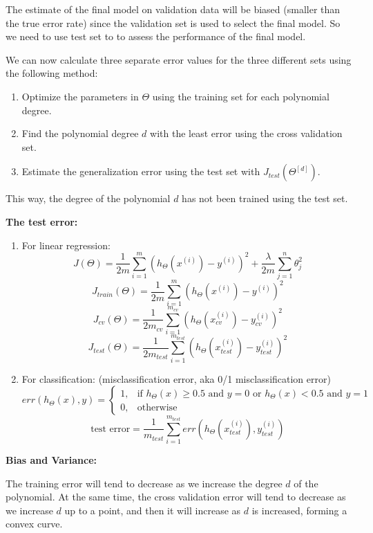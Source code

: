 \documentclass{article}
\begin{document}
\noindent The estimate of the final model on validation data will be biased (smaller than the true error rate) since the validation set is used to select the final model. So we need to use test set to to assess the performance of the final model.

\bigskip

\noindent We can now calculate three separate error values for the three different sets using the following method:
\begin{enumerate}
\item Optimize the parameters in \(\Theta\) using the training set for each polynomial degree.
\item Find the polynomial degree \(d\) with the least error using the cross validation set.
\item Estimate the generalization error using the test set with \(J_{test}(\Theta^{[d]})\).
\end{enumerate}

\noindent This way, the degree of the polynomial \(d\) has not been trained using the test set.

\bigskip

\noindent \textbf{The test error:}
\begin{enumerate}
\item For linear regression:
\[J(\Theta) = \frac{1}{2m} \sum_{i = 1}^{m} (h_{\Theta}(x^{(i)}) - y^{(i)})^2 + \frac{\lambda}{2m} \sum_{j=1}^n \theta_j^2\]
\[J_{train}(\Theta) = \frac{1}{2m} \sum_{i = 1}^{m} (h_{\Theta}(x^{(i)}) - y^{(i)})^2\]
\[J_{cv}(\Theta) = \frac{1}{2m_{cv}} \sum_{i = 1}^{m_{cv}} (h_{\Theta}(x_{cv}^{(i)}) - y_{cv}^{(i)})^2\]
\[J_{test}(\Theta) = \frac{1}{2m_{test}} \sum_{i = 1}^{m_{test}} (h_{\Theta}(x_{test}^{(i)}) - y_{test}^{(i)})^2\]
\item For classification: (misclassification error, aka 0/1 misclassification error)
\[err(h_{\Theta}(x), y) = 
\begin{cases}
1, & \text{if } h_{\Theta}(x) \geq 0.5 \text{ and } y = 0 \text{ or } h_{\Theta}(x) < 0.5 \text{ and } y = 1\\
0, & \text{otherwise}
\end{cases}
\]
\[\text{test error} = \frac{1}{m_{test}} \sum_{i = 1}^{m_{test}} err(h_{\Theta}(x_{test}^{(i)}), y_{test}^{(i)})\]
\end{enumerate}

\noindent \textbf{Bias and Variance:}

\noindent The training error will tend to decrease as we increase the degree \(d\) of the polynomial. At the same time, the cross validation error will tend to decrease as we increase \(d\) up to a point, and then it will increase as \(d\) is increased, forming a convex curve.
\end{document}
